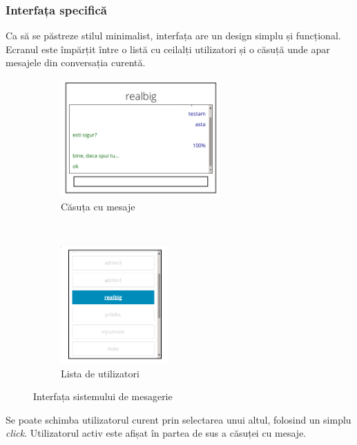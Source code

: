 \documentclass[12pt,a4paper]{article}
\begin{document}
\subsubsection{Interfața specifică}
Ca să se păstreze stilul minimalist, interfața are un design simplu și funcțional. 
Ecranul este împărțit între o listă cu ceilalți utilizatori și o căsuță unde apar mesajele
din conversația curentă. 

\begin{figure}[h!]
        \centering
        \begin{subfigure}[b]{0.45\textwidth}
                \includegraphics[height=4.5cm]{img/zona.png}
                \caption{Căsuța cu mesaje}
        \end{subfigure}%
        ~ \qquad 
        \begin{subfigure}[b]{0.35\textwidth}
                \includegraphics[height=4.5cm]{img/lista.png}
                \caption{Lista de utilizatori}
        \end{subfigure}
        \vspace{-7px}
        \caption{Interfața sistemului de mesagerie}%
\end{figure}

Se poate schimba utilizatorul curent prin selectarea unui altul, folosind un simplu \textit{click}. Utilizatorul activ este afișat în partea de sus a căsuței cu mesaje. 
\end{document}

